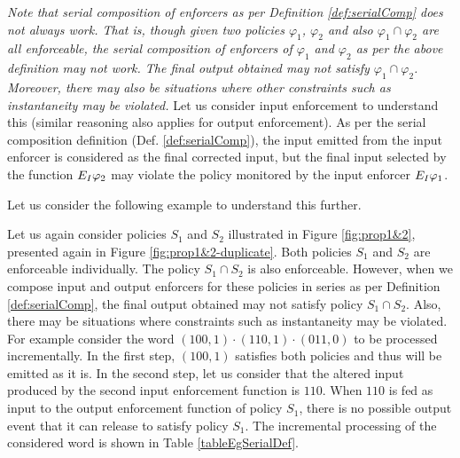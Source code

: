 \emph{Note that serial composition of enforcers as per Definition \ref{def:serialComp} does not always work. 
	That is, though given two policies $\varphi_1$, $\varphi_2$ and also $\varphi_1 \cap \varphi_2$ are all enforceable, the serial composition of enforcers of $\varphi_1$ and $\varphi_2$ as per the above definition may not work. The final output obtained may not satisfy $\varphi_1 \cap \varphi_2$. Moreover, there may also be situations where other constraints\blue{,} such as instantaneity\blue{,} may be violated.} Let us consider input enforcement to understand this (similar reasoning also applies for output enforcement). As per the serial composition definition (Def. \ref{def:serialComp}), the input emitted from the input enforcer  is considered as the final corrected input, but the final input selected by the function $E_{I}{\varphi_2}$  may violate the policy monitored by the input enforcer $E_{I}{\varphi_1}$.     

Let us consider the following example to understand this further.


\begin{example}
	Let us again consider policies $S_1$ and $S_2$ illustrated in Figure \ref{fig:prop1&2}, presented again in Figure \ref{fig:prop1&2-duplicate}. 
	Both policies $S_1$ and $S_2$ are enforceable individually. The policy $S_1 \cap S_2$ is also enforceable. 
	However, when we compose input and output enforcers for these policies in series as per Definition \ref{def:serialComp}, the final output obtained may not satisfy policy $S_1 \cap S_2$. 
	Also, there may be situations where constraints such as instantaneity may be violated. 
	For example\blue{,} consider the word $(100,1) \cdot (110,1) \cdot (011,0)$ to be processed incrementally.   
	In the first step, $(100,1)$ satisfies both policies and thus will be emitted as it is.
	In the second step, let us consider that the altered input produced by the second input enforcement function is $110$. 
	When $110$ is fed as input to the output enforcement function of policy $S_1$, there is no possible output event that it can release to satisfy policy $S_1$. The incremental processing of the considered word is shown in Table \ref{tableEgSerialDef}.	
\end{example}

